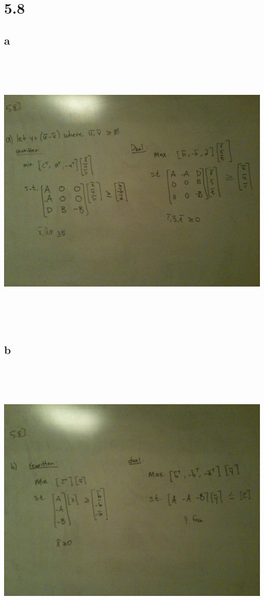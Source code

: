 \documentclass[a4paper,12pt]{article}
\begin{document}
\section*{5.8}
\subsection*{a}
\includegraphics[width=14cm, height=14cm, keepaspectratio=true]{image/fiveeight-a.jpg}
\subsection*{b}
\includegraphics[width=14cm, height=14cm, keepaspectratio=true]{image/fiveeight-b.jpg}
\end{document}
